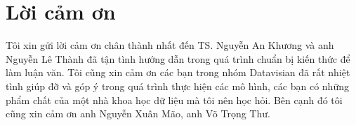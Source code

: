 \chapter*{Lời cảm ơn}
Tôi xin gửi lời cảm ơn chân thành nhất đến TS. Nguyễn An Khương và anh Nguyễn Lê Thành đã tận tình hướng dẫn trong quá trình chuẩn bị kiến thức để làm luận văn. Tôi cũng xin cảm ơn các bạn trong nhóm Datavisian đã rất nhiệt tình giúp đỡ và góp ý trong quá trình thực hiện các mô hình, các bạn có những phẩm chất của một nhà khoa học dữ liệu mà tôi nên học hỏi. Bên cạnh đó tôi cũng xin cảm ơn anh Nguyễn Xuân Mão, anh Võ Trọng Thư.
